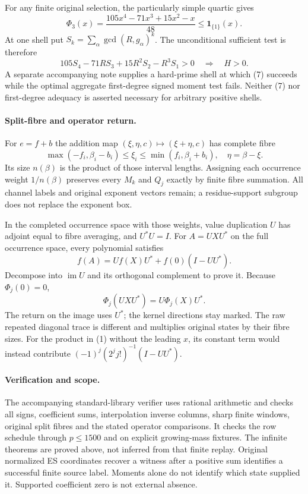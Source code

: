 \documentclass[10pt,a4paper]{article}
\begin{document}
For any finite original selection, the particularly simple quartic gives
\[
 \Phi_3(x)=\frac{105x^4-71x^3+15x^2-x}{48}\le\mathbf1_{\{1\}}(x).
\]
At one shell put $S_k=\sum_\alpha\gcd(R,g_\alpha)^k$. The unconditional
sufficient test is therefore
\[
 \boxed{105S_4-71RS_3+15R^2S_2-R^3S_1>0\quad\Longrightarrow\quad H>0.}
 \tag{7}
\]
A separate accompanying note supplies a hard-prime shell at which (7) succeeds
while the optimal aggregate first-degree signed moment test fails. Neither (7)
nor first-degree adequacy is asserted necessary for arbitrary positive shells.

\paragraph{Split-fibre and operator return.}
For $e=f+b$ the addition map $(\xi,\eta,c)\mapsto(\xi+\eta,c)$ has complete
fibre
\[
 \max(-f_i,\beta_i-b_i)\le\xi_i\le\min(f_i,\beta_i+b_i),
 \quad\eta=\beta-\xi.
\]
Its size $n(\beta)$ is the product of those interval lengths. Assigning each
occurrence weight $1/n(\beta)$ preserves every $M_k$ and $Q_j$ exactly by
finite fibre summation. All channel labels and original exponent vectors
remain; a residue-support subgroup does not replace the exponent box.

In the completed occurrence space with those weights, value duplication $U$
has adjoint equal to fibre averaging, and $U^*U=I$. For $A=UXU^*$ on the full
occurrence space, every polynomial satisfies
\[
 f(A)=Uf(X)U^*+f(0)(I-UU^*).
\]
Decompose into $\operatorname{im}U$ and its orthogonal complement to prove it.
Because $\Phi_j(0)=0$,
\[
 \boxed{\Phi_j(UXU^*)=U\Phi_j(X)U^*.}
 \tag{8}
\]
The return on the image uses $U^*$; the kernel directions stay marked.
The raw repeated diagonal trace is different and multiplies original states
by their fibre sizes. For the product in (1) without the leading $x$, its
constant term would instead contribute
$(-1)^j(2^jj!)^{-1}(I-UU^*)$.

\paragraph{Verification and scope.}
The accompanying standard-library verifier uses rational arithmetic and checks
all signs, coefficient sums, interpolation inverse columns, sharp finite
windows, original split fibres and the stated operator comparisons. It checks
the row schedule through $p\le1500$ and on explicit growing-mass fixtures.
The infinite theorems are proved above, not inferred from that finite replay.
Original normalized ES coordinates recover a witness after a positive sum
identifies a successful finite source label. Moments alone do not identify
which state supplied it. Supported coefficient zero is not external absence.
\end{document}
